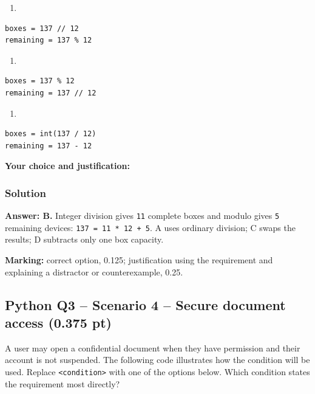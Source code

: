 \documentclass[10pt]{article}
\providecommand{\tightlist}{\setlength{\itemsep}{0pt}\setlength{\parskip}{0pt}}
\begin{document}
\begin{enumerate}
\def\labelenumi{\Alph{enumi}.}
\setcounter{enumi}{1}
\tightlist
\item
\end{enumerate}

\begin{verbatim}
boxes = 137 // 12
remaining = 137 % 12
\end{verbatim}

\begin{enumerate}
\def\labelenumi{\Alph{enumi}.}
\setcounter{enumi}{2}
\tightlist
\item
\end{enumerate}

\begin{verbatim}
boxes = 137 % 12
remaining = 137 // 12
\end{verbatim}

\begin{enumerate}
\def\labelenumi{\Alph{enumi}.}
\setcounter{enumi}{3}
\tightlist
\item
\end{enumerate}

\begin{verbatim}
boxes = int(137 / 12)
remaining = 137 - 12
\end{verbatim}

\textbf{Your choice and justification:}

\subsubsection*{Solution}
\textbf{Answer: B.} Integer division gives \texttt{11} complete boxes
and modulo gives \texttt{5} remaining devices:
\texttt{137\ =\ 11\ *\ 12\ +\ 5}. A uses ordinary division; C swaps the
results; D subtracts only one box capacity.

\textbf{Marking:} correct option, 0.125; justification using the
requirement and explaining a distractor or counterexample, 0.25.

\clearpage
\subsection*{Python Q3 -- Scenario 4 -- Secure document access (0.375 pt)}
A user may open a confidential document when they have permission and
their account is not suspended. The following code illustrates how the
condition will be used. Replace \texttt{<condition>} with one of the
options below. Which condition states the requirement most directly?
\end{document}
